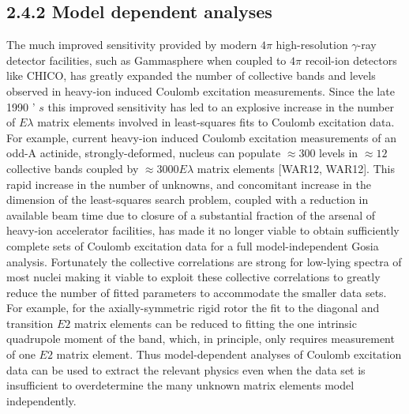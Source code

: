 \documentclass[10pt]{article}
\begin{document}
\subsection*{2.4.2 Model dependent analyses}
The much improved sensitivity provided by modern $4 \pi$ high-resolution $\gamma$-ray detector facilities, such as Gammasphere when coupled to $4 \pi$ recoil-ion detectors like CHICO, has greatly expanded the number of collective bands and levels observed in heavy-ion induced Coulomb excitation measurements. Since the late 1990 ' $s$ this improved sensitivity has led to an explosive increase in the number of $E \lambda$ matrix elements involved in least-squares fits to Coulomb excitation data. For example, current heavy-ion induced Coulomb excitation measurements of an odd-A actinide, strongly-deformed, nucleus can populate $\approx 300$ levels in $\approx 12$ collective bands coupled by $\approx 3000 E \lambda$ matrix elements [WAR12, WAR12]. This rapid increase in the number of unknowns, and concomitant increase in the dimension of the least-squares search problem, coupled with a reduction in available beam time due to closure of a substantial fraction of the arsenal of heavy-ion accelerator facilities, has made it no longer viable to obtain sufficiently complete sets of Coulomb excitation data for a full model-independent Gosia analysis. Fortunately the collective correlations are strong for low-lying spectra of most nuclei making it viable to exploit these collective correlations to greatly reduce the number of fitted parameters to accommodate the smaller data sets. For example, for the axially-symmetric rigid rotor the fit to the diagonal and transition $E 2$ matrix elements can be reduced to fitting the one intrinsic quadrupole moment of the band, which, in principle, only requires measurement of one $E 2$ matrix element. Thus model-dependent analyses of Coulomb excitation data can be used to extract the relevant physics even when the data set is insufficient to overdetermine the many unknown matrix elements model independently.
\end{document}
